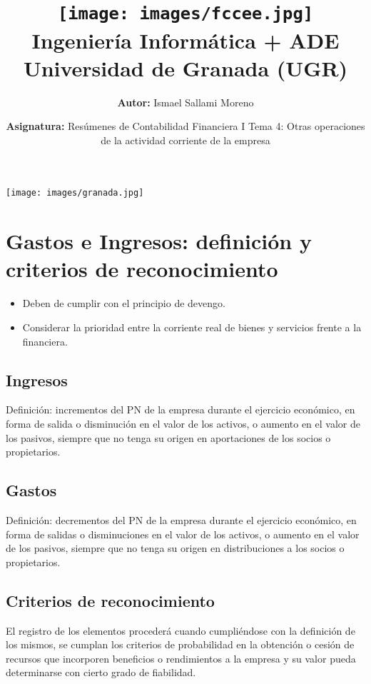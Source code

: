 \documentclass[a4paper,12pt]{article}
\title{
    \vspace{-2cm}
    \texttt{[image: images/fccee.jpg]} \\ %
    \LARGE Ingeniería Informática + ADE\\
    \large Universidad de Granada (UGR)\\[1cm]
}
\author{\textbf{Autor:} Ismael Sallami Moreno}
\date{\textbf{Asignatura:} Resúmenes de Contabilidad Financiera I Tema 4: Otras operaciones de la actividad corriente de la empresa}
\begin{document}
\maketitle
\thispagestyle{empty}

\begin{center}
    \texttt{[image: images/granada.jpg]} \\ %
    \vfill
\end{center}

\newpage

\tableofcontents
\newpage

\section{Gastos e Ingresos: definición y criterios de reconocimiento}

\begin{itemize}
    \item Deben de cumplir con el principio de devengo.
    \item Considerar la prioridad entre la corriente real de bienes y servicios frente a la financiera.
\end{itemize}

\subsection{Ingresos}
Definición: incrementos del PN de la empresa durante el ejercicio económico, en forma de salida o disminución en el valor de los activos, o aumento en el valor de los pasivos, siempre que no tenga su origen en aportaciones de los socios o propietarios.

\subsection{Gastos}
Definición: decrementos del PN de la empresa durante el ejercicio económico, en forma de salidas o disminuciones en el valor de los activos, o aumento en el valor de los pasivos, siempre que no tenga su origen en distribuciones a los socios o propietarios.

\subsection{Criterios de reconocimiento}
El registro de los elementos procederá cuando cumpliéndose con la definición de los mismos, se cumplan los criterios de probabilidad en la obtención o cesión de recursos que incorporen beneficios o rendimientos a la empresa y su valor pueda determinarse con cierto grado de fiabilidad.
\end{document}
